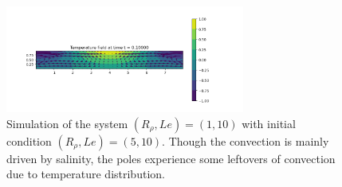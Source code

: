 \documentclass{article}
\begin{document}
\begin{figure}[ht]
  \centering
  \includegraphics[width=0.7\textwidth]{images/last_subsection/combination_temperature_temp_R_rho_5_to_1_prs_0_1.png}
  \caption{Simulation of the system $(R_{\rho},Le) = (1,10)$ with initial condition $(R_{\rho},Le) = (5,10)$. Though the convection is mainly driven by salinity, the poles experience some leftovers of convection due to temperature distribution.}
  \label{fig:mix_transient}
\end{figure}
\end{document}
